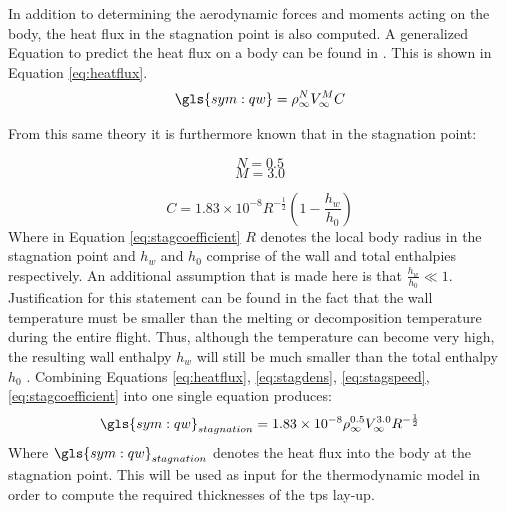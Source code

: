 In addition to determining the aerodynamic forces and moments acting on the body, the heat flux in the stagnation point is also computed. A generalized Equation to predict the heat flux on a body can be found in \cite{AndersonJr.2006,Tauber1986}. This  is shown in Equation \ref{eq:heatflux}.
\begin{equation}
\gls{sym:qw}=\rho_{\infty}^{N}V_{\infty}^{M}C
\label{eq:heatflux}
\end{equation}

From this same theory it is furthermore known that in the stagnation point: 
\begin{multicols}{2}
\begin{equation}
\label{eq:stagdens}
N=0.5
\end{equation} \break
\begin{equation}
\label{eq:stagspeed}
M=3.0
\end{equation}
\end{multicols}
\begin{equation}
\label{eq:stagcoefficient}
C=1.83 \times 10^{-8} R^{-\frac{1}{2}}\left(1-\frac{h_{w}}{h_{0}}\right)
\end{equation}
Where in Equation \ref{eq:stagcoefficient} $R$ denotes the local body radius in the stagnation point and $h_{w}$ and $h_{0}$ comprise of the wall and total enthalpies respectively. An additional assumption that is made here is that $\frac{h_{w}}{h_{0}}\ll 1$. Justification for this statement can be found in the fact that the wall temperature must be smaller than the melting or decomposition temperature during the entire flight. Thus, although the temperature can become very high, the resulting wall enthalpy $h_{w}$ will still be much smaller than the total enthalpy $h_{0}$ \cite[p.347]{AndersonJr.2006}. %
Combining Equations \ref{eq:heatflux}, \ref{eq:stagdens}, \ref{eq:stagspeed}, \ref{eq:stagcoefficient} into one single equation produces:
\begin{equation}
\gls{sym:qw}_{stagnation}=1.83 \times 10^{-8}\rho_{\infty}^{0.5} V_{\infty}^{3.0} R^{-\frac{1}{2}}
\label{eq:qstag}
\end{equation}
Where $\gls{sym:qw}_{stagnation}$ denotes the heat flux into the body at the stagnation point. This will be used as input for the thermodynamic model in order to compute the required thicknesses of the \acrfull{tps} lay-up.

